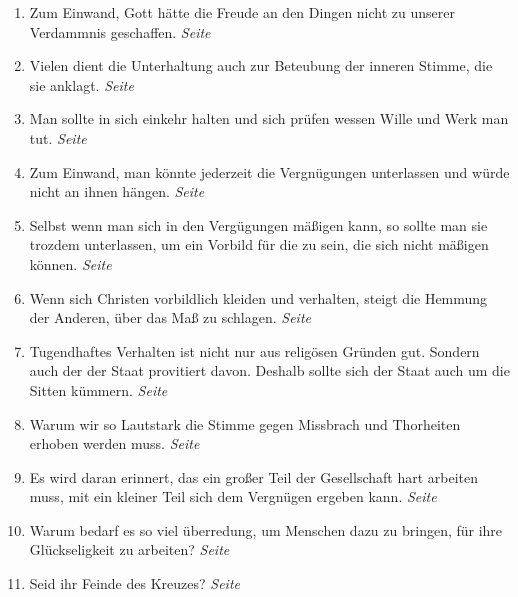 \begin{enumerate}
 \item Zum Einwand, Gott hätte die Freude an den Dingen nicht zu unserer
Verdammnis geschaffen.
 \dotfill \textit{Seite \pageref{ref:17_11_einwand_2}}\\

 \item Vielen dient die Unterhaltung auch zur Beteubung der inneren Stimme, die
sie anklagt.
 \dotfill \textit{Seite \pageref{ref:17_11_beteubung}}\\

 \item Man sollte in sich einkehr halten und sich prüfen wessen Wille und Werk
man tut.
 \dotfill \textit{Seite \pageref{ref:17_12_einkehr}}\\

 \item Zum Einwand, man könnte jederzeit die Vergnügungen unterlassen und würde
nicht an ihnen hängen.
 \dotfill \textit{Seite \pageref{ref:18_02_einwand}}\\

 \item Selbst wenn man sich in den Vergügungen mäßigen kann, so sollte man sie
trozdem unterlassen, um ein Vorbild für die zu sein, die sich nicht mäßigen
können.
 \dotfill \textit{Seite \pageref{ref:18_03_vorbild}}\\

 \item Wenn sich Christen vorbildlich kleiden und verhalten, steigt die Hemmung
der Anderen, über das Maß zu schlagen.
 \dotfill \textit{Seite \pageref{ref:18_08_vorbild_kleidung}}\\

 \item Tugendhaftes Verhalten ist nicht nur aus religösen Gründen gut. Sondern
auch der der Staat provitiert davon. Deshalb sollte sich der Staat auch um die
Sitten kümmern.
 \dotfill \textit{Seite \pageref{ref:18_09_gesellschaftlich}}\\

 \item Warum wir so Lautstark die Stimme gegen Missbrach und Thorheiten erhoben
werden muss.
 \dotfill \textit{Seite \pageref{ref:18_09_lautstark}}\\

 \item Es wird daran erinnert, das ein großer Teil der Gesellschaft hart
arbeiten muss, mit ein kleiner Teil sich dem Vergnügen ergeben kann.
 \dotfill \textit{Seite \pageref{ref:18_10_ungeraechtikeit}}\\

 \item Warum bedarf es so viel überredung, um Menschen dazu zu bringen, für ihre
Glückseligkeit zu arbeiten?
 \dotfill \textit{Seite \pageref{ref:18_11_ueberredung}}\\

 \item Seid ihr Feinde des Kreuzes?
 \dotfill \textit{Seite \pageref{ref:18_11_feinde_des_kreuzes}}\\
\end{enumerate}